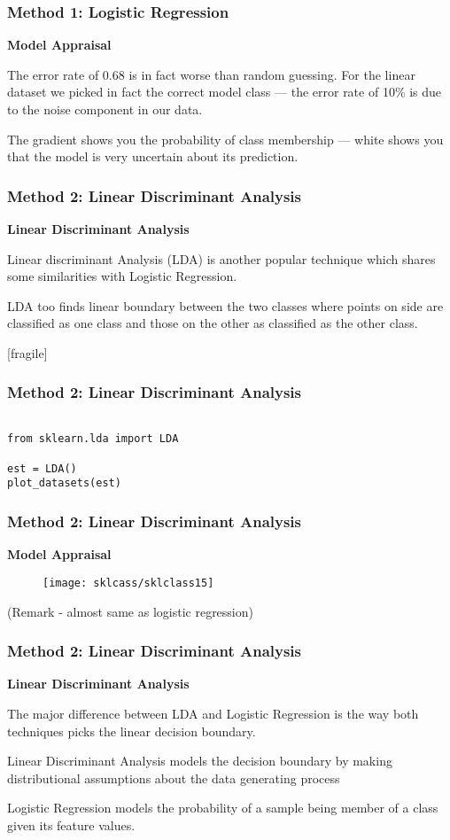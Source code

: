 \documentclass[MASTER.tex]{subfiles}
\begin{document}
 \frametitle{Method 1: Logistic Regression}
   
  \textbf{Model Appraisal}
  
  
   The error rate of 0.68 is in fact worse than random guessing.  For the linear dataset we picked in fact the correct model class — the error rate of 10\% is due to the noise component in our data. 
\item The gradient shows you the probability of class membership — white shows you that the model is very uncertain about its prediction.
 

 

 
\frametitle{Method 2: Linear Discriminant Analysis}
 
\textbf{Linear Discriminant Analysis}
 
\item Linear discriminant Analysis (LDA) is another popular technique which shares some similarities with Logistic Regression. 
\item LDA too finds linear boundary between the two classes where points on side are classified as one class and those on the other as classified as the other class.
 

 

 [fragile]
\frametitle{Method 2: Linear Discriminant Analysis} 
 
\begin{framed}
\begin{verbatim}

from sklearn.lda import LDA

est = LDA()
plot_datasets(est)
  \end{verbatim}
 \end{framed}
 
 
\frametitle{Method 2: Linear Discriminant Analysis}
\textbf{Model Appraisal}
\begin{figure}
\centering
\texttt{[image: sklcass/sklclass15]}

\end{figure}
(Remark - almost same as logistic regression)
 
 
 \frametitle{Method 2: Linear Discriminant Analysis}
 
\textbf{Linear Discriminant Analysis}
 
\item The major difference between LDA and Logistic Regression is the way both techniques picks the linear decision boundary.
\item  Linear Discriminant Analysis models the decision boundary by making distributional assumptions about the data generating process 
\item Logistic Regression models the probability of a sample being member of a class given its feature values.
 
\end{document}
